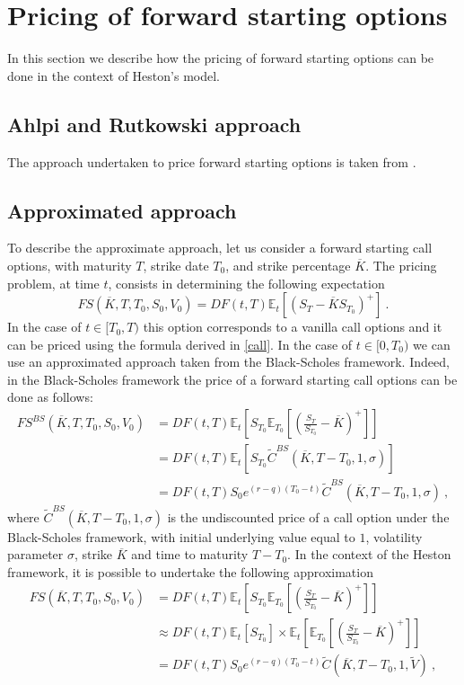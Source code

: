 \section{Pricing of forward starting options}
In this section we describe how the pricing of forward starting options can be done in the context of Heston's model. 

\subsection{Ahlpi and Rutkowski approach}
The approach undertaken to price forward starting options is taken from \cite{ahlip2009forward}.


\subsection{Approximated approach}
To describe the approximate approach, let us consider a forward starting call options, with maturity $T$, strike date $T_0$, and strike percentage $\overline{K}$. 
The pricing problem, at time $t$, consists in determining the following expectation
$$
FS(\overline{K}, T, T_0, S_0, V_0)  = DF(t,T) \mathbb{E}_t   \left[\left(S_T - \overline{K} S_{T_0}\right)^+\right] \ .
$$
In the case of $t \in [T_0, T)$ this option corresponds to a vanilla call options and it can be priced using the formula derived in \ref{call}. 
In the case of $t \in [0, T_0)$ we can use an approximated approach taken from the Black-Scholes framework. 
Indeed, in the Black-Scholes framework the price of a forward starting call options can be done as follows:
$$
\begin{aligned}
FS^{BS}(\overline{K}, T, T_0, S_0, V_0) 
&= DF(t,T)  \mathbb{E}_t   \left[  S_{T_0}  \mathbb{E}_{T_0} \left[ \left( \frac{S_T}{S_{T_0}} - \overline{K}\right)^+\right]       \right]
\\
&=
DF(t,T) \mathbb{E}_t \left[ S_{T_0}  \widetilde{C}^{BS}(\overline{K}, T-T_0, 1 ,\sigma) \right] 
\\ &=DF(t,T) S_0 e^{(r-q) (T_0-t)}   \widetilde{C}^{BS}(\overline{K}, T-T_0, 1 ,\sigma) \ , 
\end{aligned}
$$
where $\widetilde{C}^{BS}(\overline{K}, T-T_0, 1 , \sigma)$ is the undiscounted price of a call option under the Black-Scholes framework, with initial underlying value equal to $1$, volatility parameter $\sigma$, strike $\overline{K}$ and time to maturity $T-T_0$.
In the context of the Heston framework, it is possible to undertake the following approximation
$$
\begin{aligned}
FS(\overline{K}, T, T_0, S_0, V_0) 
&= DF(t,T) \mathbb{E}_t   \left[  S_{T_0}   \mathbb{E}_{T_0} \left[ \left( \frac{S_T}{S_{T_0}} - \overline{K}\right)^+\right]       \right]
\\
&\approx DF(t,T)  \mathbb{E}_t   \left[  S_{T_0}  \right] \times \mathbb{E}_t \left[ \mathbb{E}_{T_0} \left[ \left( \frac{S_T}{S_{T_0}} - \overline{K}\right)^+\right]       \right]
\\ 
&=
DF(t,T)  S_0 e^{(r-q) (T_0-t)}    \widetilde{C}(\overline{K}, T-T_0, 1, \widetilde{V}) \ , 
\end{aligned}
$$
